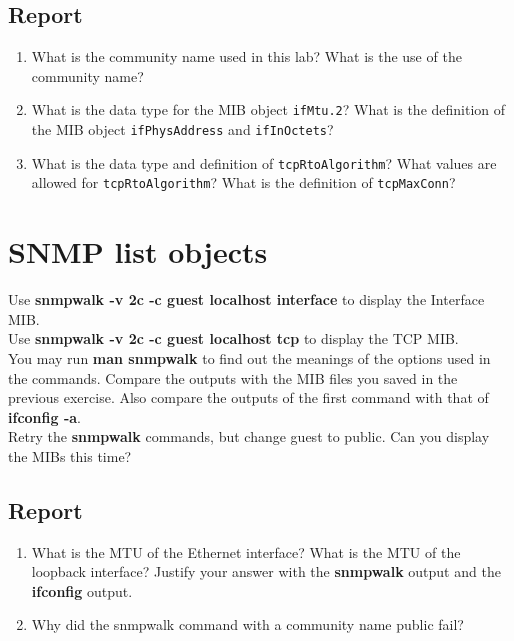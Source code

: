 \documentclass[10pt,a4paper]{article}
\numberwithin{equation}{section}
\numberwithin{figure}{section}
\numberwithin{table}{section}
\begin{document}
	\subsection*{Report}
	\begin{enumerate}
		\item What is the community name used in this lab? What is the use of the
		community name?
		\item What is the data type for the MIB object \texttt{ifMtu.2}? What is the definition of the MIB object \texttt{ifPhysAddress} and \texttt{ifInOctets}?
		\item What is the data type and definition of \texttt{tcpRtoAlgorithm}? What values are allowed for \texttt{tcpRtoAlgorithm}? What is the definition of \texttt{tcpMaxConn}?
	\end{enumerate}

\section{SNMP list objects}
	Use \textbf{snmpwalk -v 2c -c guest localhost interface} to display the Interface MIB.\\
	Use \textbf{snmpwalk -v 2c -c guest localhost tcp} to display the TCP MIB.\\
	You may run \textbf{man snmpwalk} to find out the meanings of the options used in the commands. Compare the outputs with the MIB files you saved in the previous exercise. Also compare the outputs of the first command with that of \textbf{ifconfig -a}.\\
	Retry the \textbf{snmpwalk} commands, but change guest to public. Can you display the MIBs this time?
	
	\subsection*{Report}
	\begin{enumerate}
		\item What is the MTU of the Ethernet interface? What is the MTU of the loopback interface? Justify your answer with the \textbf{snmpwalk} output and the \textbf{ifconfig} output.
		\item Why did the snmpwalk command with a community name public fail?
	\end{enumerate}
\end{document}
